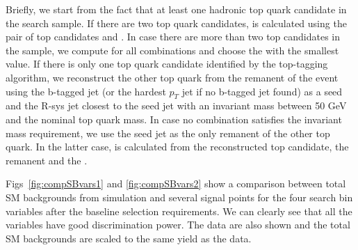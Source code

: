 Briefly, we start from the fact that at least one hadronic top quark candidate in the search sample. 
If there are two top quark candidates, \MTTwo is calculated using the pair of top 
candidates and \MET. In case there are more than two top candidates
in the sample, we compute \MTTwo for all combinations and choose the 
\MTTwo with the smallest value. If there is only one top quark candidate identified
by the top-tagging algorithm, we reconstruct the other top 
quark from the remanent of the event using the b-tagged jet (or the hardest $p_{T}$ jet if no b-tagged jet found) as a seed and the R-sys 
jet closest to the seed jet with an invariant mass between 50 GeV and 
the nominal top quark mass. In case no combination satisfies the invariant mass
requirement, we use the seed jet as the only remanent of the other 
top quark. In the latter case, \MTTwo is calculated from the reconstructed top candidate, the remanent and the \MET.

Figs~\ref{fig:compSBvars1} and \ref{fig:compSBvars2} show a comparison between total SM backgrounds from simulation and several signal points for the four search bin variables after the baseline selection requirements. We can clearly see that all the variables have good discrimination power. The data are also shown and the total SM backgrounds are scaled to the same yield as the data.

